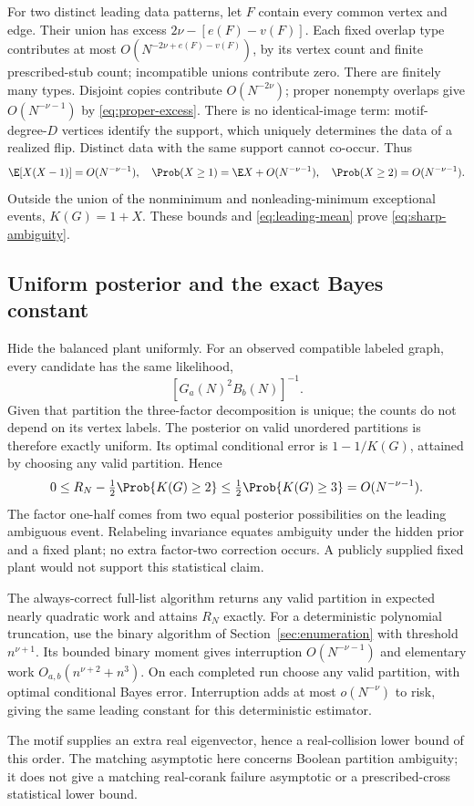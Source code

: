 For two distinct leading data patterns, let $F$ contain every common
vertex and edge. Their union has excess $2\nu-[e(F)-v(F)]$.
Each fixed overlap type contributes at most
$O(N^{-2\nu+e(F)-v(F)})$, by its vertex count and finite prescribed-stub
count; incompatible unions contribute zero. There are finitely many
types. Disjoint copies contribute $O(N^{-2\nu})$; proper nonempty
overlaps give $O(N^{-\nu-1})$ by \eqref{eq:proper-excess}.
There is no identical-image term: motif-degree-$D$ vertices identify
the support, which uniquely determines the data of a realized flip.
Distinct data with the same support cannot co-occur. Thus
\[
 \E[X(X-1)]=O(N^{-\nu-1}),\quad
 \Prob(X\ge1)=\E X+O(N^{-\nu-1}),\quad
 \Prob(X\ge2)=O(N^{-\nu-1}).
\]
Outside the union of the nonminimum and nonleading-minimum exceptional
events, $K(G)=1+X$.
These bounds and \eqref{eq:leading-mean} prove \eqref{eq:sharp-ambiguity}.

\subsection{Uniform posterior and the exact Bayes constant}
Hide the balanced plant uniformly. For an observed compatible labeled
graph, every candidate has the same likelihood,
\[
 [G_a(N)^2B_b(N)]^{-1}.
\]
Given that partition the three-factor decomposition is unique; the counts
do not depend on its vertex labels. The posterior on valid unordered
partitions is therefore exactly uniform. Its optimal conditional error
is $1-1/K(G)$, attained by choosing any valid partition. Hence
\begin{equation}\label{eq:Bayes-sandwich}
 0\le R_N-\tfrac12\Prob\{K(G)\ge2\}
 \le\tfrac12\Prob\{K(G)\ge3\}=O(N^{-\nu-1}).
\end{equation}
The factor one-half comes from two equal posterior possibilities on the
leading ambiguous event. Relabeling invariance equates ambiguity under
the hidden prior and a fixed plant; no extra factor-two correction occurs.
A publicly supplied fixed plant would not support this statistical claim.

The always-correct full-list algorithm returns any valid partition in
expected nearly quadratic work and attains $R_N$ exactly. For a
deterministic polynomial truncation, use the binary algorithm of
Section~\ref{sec:enumeration} with threshold $n^{\nu+1}$.
Its bounded binary moment gives interruption $O(N^{-\nu-1})$ and
elementary work $O_{a,b}(n^{\nu+2}+n^3)$. On each completed run
choose any valid partition, with optimal conditional Bayes error.
Interruption adds at most $o(N^{-\nu})$ to risk, giving the same leading
constant for this deterministic estimator.

The motif supplies an extra real eigenvector, hence a real-collision
lower bound of this order. The matching asymptotic here concerns Boolean
partition ambiguity; it does not give a matching real-corank failure
asymptotic or a prescribed-cross statistical lower bound.


